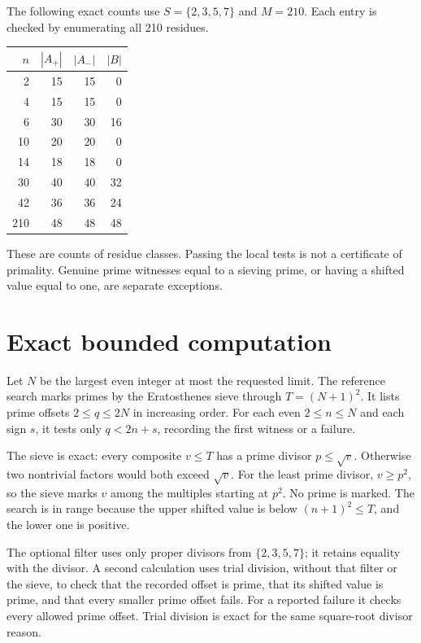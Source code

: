 \documentclass[11pt,a4paper]{article}
\begin{document}
The following exact counts use $S=\{2,3,5,7\}$ and $M=210$.
Each entry is checked by enumerating all 210 residues.
\begin{center}
\begin{tabular}{rrrr}
\toprule
$n$ & $|A_+|$ & $|A_-|$ & $|B|$\\
\midrule
2 & 15 & 15 & 0\\
4 & 15 & 15 & 0\\
6 & 30 & 30 & 16\\
10 & 20 & 20 & 0\\
14 & 18 & 18 & 0\\
30 & 40 & 40 & 32\\
42 & 36 & 36 & 24\\
210 & 48 & 48 & 48\\
\bottomrule
\end{tabular}
\end{center}
These are counts of residue classes. Passing the local tests is not a
certificate of primality. Genuine prime witnesses equal to a sieving prime,
or having a shifted value equal to one, are separate exceptions.

\newpage
\section{Exact bounded computation}
Let $N$ be the largest even integer at most the requested limit.
The reference search marks primes by the Eratosthenes sieve through
$T=(N+1)^2$. It lists prime offsets $2\le q\le2N$ in increasing order.
For each even $2\le n\le N$ and each sign $s$, it tests only
$q<2n+s$, recording the first witness or a failure.

The sieve is exact: every composite $v\le T$ has a prime divisor
$p\le\sqrt v$. Otherwise two nontrivial factors would both exceed
$\sqrt v$. For the least prime divisor, $v\ge p^2$, so the sieve marks
$v$ among the multiples starting at $p^2$. No prime is marked. The
search is in range because the upper shifted value is below
$(n+1)^2\le T$, and the lower one is positive.

The optional filter uses only proper divisors from $\{2,3,5,7\}$; it
retains equality with the divisor. A second calculation uses trial division,
without that filter or the sieve, to check that the recorded offset is prime,
that its shifted value is prime, and that every smaller prime offset fails.
For a reported failure it checks every allowed prime offset.
Trial division is exact for the same square-root divisor reason.
\end{document}
